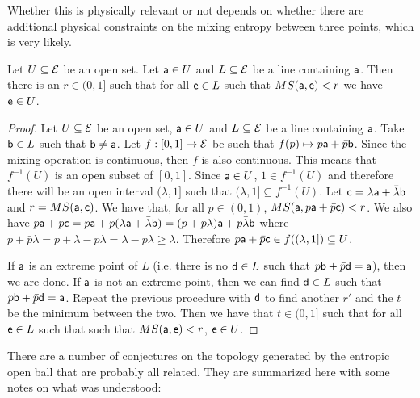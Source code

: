 \begin{mathSection}
\begin{remark}
	Whether this is physically relevant or not depends on whether there are additional physical constraints on the mixing entropy between three points, which is very likely.
\end{remark}


\begin{prop}
	Let $U \subseteq \Ens$ be an open set. Let $\ens[a] \in U$ and $L \subseteq \Ens$ be a line containing $\ens[a]$. Then there is an $r \in (0,1]$ such that for all $\ens \in L$ such that $MS(\ens[a], \ens) < r$ we have $\ens \in U$.
\end{prop}

\begin{proof}
	Let $U \subseteq \Ens$ be an open set, $\ens[a] \in U$ and $L \subseteq \Ens$ be a line containing $\ens[a]$. Take $\ens[b] \in L$ such that $\ens[b] \neq \ens[a]$. Let $f : [0,1] \to \Ens$ be such that $f(p) \mapsto p \ens[a] + \bar{p} \ens[b]$. Since the mixing operation is continuous, then $f$ is also continuous. This means that $f^{-1}(U)$ is an open subset of $[0,1]$. Since $\ens[a] \in U$, $1 \in f^{-1}(U)$ and therefore there will be an open interval $(\lambda, 1]$ such that $(\lambda, 1] \subseteq f^{-1}(U)$. Let $\ens[c] = \lambda \ens[a] + \bar{\lambda} \ens[b]$ and $r = MS(\ens[a], \ens[c])$. We have that, for all $p \in (0,1)$, $MS(\ens[a], p\ens[a] +\bar{p}\ens[c])<r$. We also have $p\ens[a] +\bar{p}\ens[c] = p\ens[a] +\bar{p}(\lambda \ens[a] + \bar{\lambda} \ens[b]) = (p + \bar{p}\lambda)\ens[a] + \bar{p}\bar{\lambda}\ens[b]$ where $p + \bar{p}\lambda = p + \lambda - p\lambda = \lambda - p\bar{\lambda} \geq \lambda$. Therefore $p\ens[a] +\bar{p}\ens[c] \in f((\lambda,1]) \subseteq U$.
	
	If $\ens[a]$ is an extreme point of $L$ (i.e. there is no $\ens[d] \in L$ such that $p\ens[b] + \bar{p}\ens[d] = \ens[a]$), then we are done. If $\ens[a]$ is not an extreme point, then we can find $\ens[d] \in L$ such that $p\ens[b] + \bar{p}\ens[d] = \ens[a]$. Repeat the previous procedure with $\ens[d]$ to find another $r'$ and the $t$ be the minimum between the two. Then we have that $t \in (0,1]$ such that for all $\ens \in L$ such that such that $MS(\ens[a], \ens) < r$, $\ens \in U$.
\end{proof}
\end{mathSection}
	
There are a number of conjectures on the topology generated by the entropic open ball that are probably all related. They are summarized here with some notes on what was understood:

